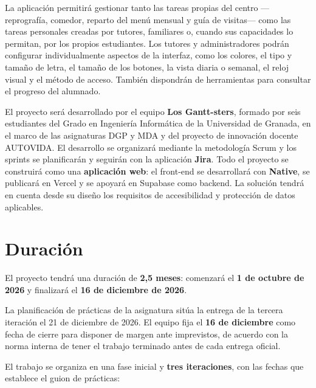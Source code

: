 \documentclass[11pt,a4paper]{article}
\newcommand{\hl}[1]{\textcolor{gblue}{\textbf{#1}}}
\begin{document}
La aplicación permitirá gestionar tanto las tareas propias del centro —reprografía, comedor, reparto del menú mensual y guía de visitas— como las tareas personales creadas por tutores, familiares o, cuando sus capacidades lo permitan, por los propios estudiantes. Los tutores y administradores podrán configurar individualmente aspectos de la interfaz, como los colores, el tipo y tamaño de letra, el tamaño de los botones, la vista diaria o semanal, el reloj visual y el método de acceso. También dispondrán de herramientas para consultar el progreso del alumnado.

El proyecto será desarrollado por el equipo \hl{Los Gantt-sters}, formado por seis estudiantes del Grado en Ingeniería Informática de la Universidad de Granada, en el marco de las asignaturas DGP y MDA y del proyecto de innovación docente AUTOVIDA. El desarrollo se organizará mediante la metodología Scrum y los sprints se planificarán y seguirán con la aplicación \hl{Jira}. Todo el proyecto se construirá como una \hl{aplicación web}: el front-end se desarrollará con \hl{Native}, se publicará en Vercel y se apoyará en Supabase como backend. La solución tendrá en cuenta desde su diseño los requisitos de accesibilidad y protección de datos aplicables.

\section{Duración}
El proyecto tendrá una duración de \hl{2,5 meses}: comenzará el \hl{1 de octubre de 2026} y finalizará el \hl{16 de diciembre de 2026}.

La planificación de prácticas de la asignatura sitúa la entrega de la tercera iteración el 21 de diciembre de 2026. El equipo fija el \hl{16 de diciembre} como fecha de cierre para disponer de margen ante imprevistos, de acuerdo con la norma interna de tener el trabajo terminado antes de cada entrega oficial.

El trabajo se organiza en una fase inicial y \hl{tres iteraciones}, con las fechas que establece el guion de prácticas:
\end{document}
